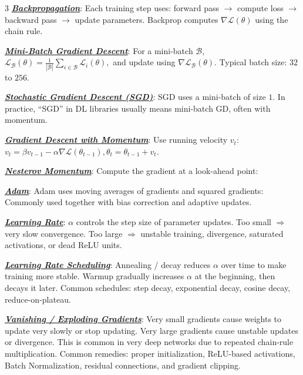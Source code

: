 \documentclass[12pt]{article}
\newcommand{\bulletPoint}[1]{\underline{\textit{\textbf{#1}}}}
\begin{document}
\begin{multicols*}{3}
\bulletPoint{Backpropagation}:
Each training step uses:
forward pass $\rightarrow$ compute loss $\rightarrow$ backward pass $\rightarrow$ update parameters.
Backprop computes $\nabla\mathcal L(\theta)$ using the chain rule.

\bulletPoint{Mini-Batch Gradient Descent}:
For a mini-batch $\mathcal B$,
$\mathcal L_{\mathcal B}(\theta)=\frac{1}{|\mathcal B|}\sum_{i\in\mathcal B}\mathcal L_i(\theta),$
and update using $\nabla \mathcal L_{\mathcal B}(\theta).$
Typical batch size: $32$ to $256$.

\bulletPoint{Stochastic Gradient Descent (SGD)}:
SGD uses a mini-batch of size $1$.
In practice, “SGD” in DL libraries usually means mini-batch GD, often with momentum.

\bulletPoint{Gradient Descent with Momentum}:
Use running velocity $v_t$:
\textcolor{purple!60!black}{$\textstyle
v_t=\beta v_{t-1}-\alpha \nabla \mathcal L(\theta_{t-1}),
\theta_t=\theta_{t-1}+v_t.
$}

\bulletPoint{Nesterov Momentum}:
Compute the gradient at a look-ahead point:

\bulletPoint{Adam}:
Adam uses moving averages of gradients and squared gradients:
Commonly used together with bias correction and adaptive updates.

\bulletPoint{Learning Rate}:
$\alpha$ controls the step size of parameter updates.
Too small $\Rightarrow$ very slow convergence.
Too large $\Rightarrow$ unstable training, divergence, saturated activations, or dead ReLU units.

\bulletPoint{Learning Rate Scheduling}:
Annealing / decay reduces $\alpha$ over time to make training more stable.
Warmup gradually increases $\alpha$ at the beginning, then decays it later.
Common schedules: step decay, exponential decay, cosine decay, reduce-on-plateau.

\bulletPoint{Vanishing / Exploding Gradients}:
Very small gradients cause weights to update very slowly or stop updating.
Very large gradients cause unstable updates or divergence.
This is common in very deep networks due to repeated chain-rule multiplication.
Common remedies: proper initialization, ReLU-based activations, Batch Normalization, residual connections, and gradient clipping.


\end{multicols*}
\end{document}
